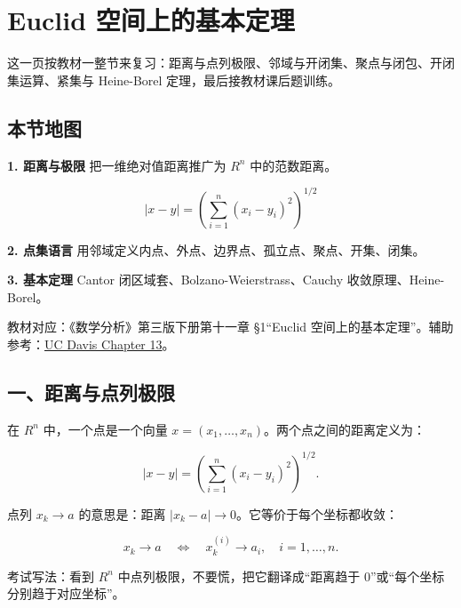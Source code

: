 \section{Euclid 空间上的基本定理}

这一页按教材一整节来复习：距离与点列极限、邻域与开闭集、聚点与闭包、开闭集运算、紧集与 Heine-Borel 定理，最后接教材课后题训练。

\subsection*{本节地图}

\begin{conceptbox}
\textbf{1. 距离与极限}
把一维绝对值距离推广为 \(R^n\) 中的范数距离。

\[
          |x-y|=\left(\sum_{i=1}^{n}(x_i-y_i)^2\right)^{1/2}
        \]
\end{conceptbox}

\begin{conceptbox}
\textbf{2. 点集语言}
用邻域定义内点、外点、边界点、孤立点、聚点、开集、闭集。
\end{conceptbox}

\begin{conceptbox}
\textbf{3. 基本定理}
Cantor 闭区域套、Bolzano-Weierstrass、Cauchy 收敛原理、Heine-Borel。
\end{conceptbox}

教材对应：《数学分析》第三版下册第十一章 §1“Euclid 空间上的基本定理”。辅助参考：\href{https://www.math.ucdavis.edu/~hunter/intro_analysis_pdf/ch13.pdf}{UC Davis Chapter 13}。

\subsection*{一、距离与点列极限}

在 \(R^n\) 中，一个点是一个向量 \(x=(x_1,\ldots,x_n)\)。两个点之间的距离定义为：

\[
      |x-y|=\left(\sum_{i=1}^{n}(x_i-y_i)^2\right)^{1/2}.
    \]

点列 \(x_k\to a\) 的意思是：距离 \(|x_k-a|\to 0\)。它等价于每个坐标都收敛：

\[
      x_k\to a \quad\Longleftrightarrow\quad x_k^{(i)}\to a_i,\quad i=1,\ldots,n.
    \]

\begin{notebox}
考试写法：看到 \(R^n\) 中点列极限，不要慌，把它翻译成“距离趋于 0”或“每个坐标分别趋于对应坐标”。
\end{notebox}

